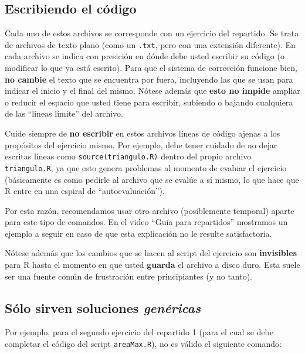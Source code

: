 \documentclass[]{article}
\begin{document}
\subsection{Escribiendo el código}

Cada uno de estos archivos se corresponde con un ejercicio del
repartido. Se trata de archivos de texto plano (como un \texttt{.txt},
pero con una extensión diferente). En cada archivo se indica con
presición en dónde debe usted escribir su código (o modificar lo que ya
está escrito). Para que el sistema de corrección funcione bien,
\textbf{no cambie} el texto que se encuentra por fuera, incluyendo las
que se usan para indicar el inicio y el final del mismo. Nótese además
que \textbf{esto no impide} ampliar o reducir el espacio que usted tiene
para escribir, subiendo o bajando cualquiera de las ``líneas límite''
del archivo.

Cuide siempre de \textbf{no escribir} en estos archivos líneas de código
ajenas a los propósitos del ejercicio mismo. Por ejemplo, debe tener
cuidado de no dejar escritas líneas como \texttt{source(triangulo.R)}
dentro del propio archivo \texttt{triangulo.R}, ya que esto genera
problemas al momento de evaluar el ejercicio (básicamente es como
pedirle al archivo que se evalúe a sí mismo, lo que hace que R entre en
una espiral de ``autoevaluación'').

Por esta razón, recomendamos usar otro archivo (posiblemente temporal)
aparte para este tipo de comandos. En el video ``Guía para repartidos''
mostramos un ejemplo a seguir en caso de que esta explicación no le
resulte satisfactoria.

Nótese además que los cambios que se hacen al script del ejercicio son
\textbf{invisibles} para R hasta el momento en que usted \textbf{guarda}
el archivo a disco duro. Esta suele ser una fuente común de frustración
entre principiantes (y no tanto).

\subsection{Sólo sirven soluciones \emph{genéricas}}

Por ejemplo, para el segundo ejercicio del repartido 1 (para el cual se
debe completar el código del script \texttt{areaMax.R}), no es válido el
siguiente comando:
\end{document}
